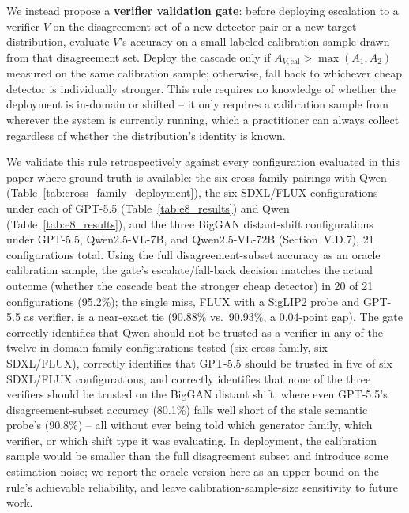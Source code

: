 \documentclass{ieeeaccess}
\begin{document}
We instead propose a \textbf{verifier validation gate}: before deploying escalation to a
verifier $V$ on the disagreement set of a new detector pair or a new target
distribution, evaluate $V$'s accuracy on a small labeled calibration sample drawn from
that disagreement set. Deploy the cascade only if $A_{V,\text{cal}} >
\max(A_1, A_2)$ measured on the same calibration sample; otherwise, fall back to
whichever cheap detector is individually stronger. This rule requires no knowledge of
whether the deployment is in-domain or shifted -- it only requires a calibration sample
from wherever the system is currently running, which a practitioner can always collect
regardless of whether the distribution's identity is known.

We validate this rule retrospectively against every configuration evaluated in this
paper where ground truth is available: the six cross-family pairings with Qwen
(Table~\ref{tab:cross_family_deployment}), the six SDXL/FLUX configurations under
each of GPT-5.5 (Table~\ref{tab:e8_results}) and Qwen (Table~\ref{tab:e8_results}), and
the three BigGAN distant-shift configurations under GPT-5.5, Qwen2.5-VL-7B, and
Qwen2.5-VL-72B (Section~V.D.7), 21 configurations total. Using the full
disagreement-subset accuracy as an oracle calibration sample, the gate's
escalate/fall-back decision matches the actual outcome (whether the cascade beat the
stronger cheap detector) in 20 of 21 configurations (95.2\%); the single miss, FLUX
with a SigLIP2 probe and GPT-5.5 as verifier, is a near-exact tie (90.88\% vs.\ 90.93\%,
a 0.04-point gap). The gate correctly identifies that Qwen should not be trusted as a
verifier in any of the twelve in-domain-family configurations tested (six cross-family,
six SDXL/FLUX), correctly identifies that GPT-5.5 should be trusted in five of six
SDXL/FLUX configurations, and correctly identifies that none of the three verifiers
should be trusted on the BigGAN distant shift, where even GPT-5.5's disagreement-subset
accuracy (80.1\%) falls well short of the stale semantic probe's (90.8\%) -- all without
ever being told which generator family, which verifier, or which shift type it was
evaluating. In deployment, the calibration sample would be smaller than the full
disagreement subset and introduce some estimation noise; we report the oracle version
here as an upper bound on the rule's achievable reliability, and leave
calibration-sample-size sensitivity to future work.
\end{document}
